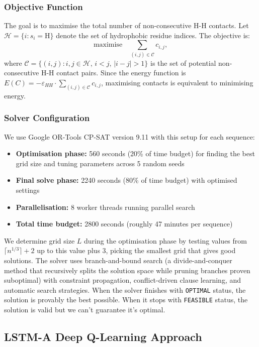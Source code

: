 \documentclass{article}
\theoremstyle{plain}
\theoremstyle{definition}
\begin{document}
\subsubsection{Objective Function}

The goal is to maximise the total number of non-consecutive H-H contacts. Let $\mathcal{H} = \{i : s_i = \text{H}\}$ denote the set of hydrophobic residue indices. The objective is:
\begin{equation}
\text{maximise} \quad \sum_{(i,j) \in \mathcal{C}} c_{i,j},
\end{equation}
where $\mathcal{C} = \{(i,j) : i,j \in \mathcal{H}, \, i < j, \, |i - j| > 1\}$ is the set of potential non-consecutive H-H contact pairs. Since the energy function is $E(C) = -\varepsilon_{HH} \cdot \sum_{(i,j) \in \mathcal{C}} c_{i,j}$, maximising contacts is equivalent to minimising energy.

\subsubsection{Solver Configuration}

We use Google OR-Tools CP-SAT version 9.11 with this setup for each sequence:
\begin{itemize}
\item \textbf{Optimisation phase:} 560 seconds (20\% of time budget) for finding the best grid size and tuning parameters across 5 random seeds
\item \textbf{Final solve phase:} 2240 seconds (80\% of time budget) with optimised settings
\item \textbf{Parallelisation:} 8 worker threads running parallel search
\item \textbf{Total time budget:} 2800 seconds (roughly 47 minutes per sequence)
\end{itemize}
We determine grid size $L$ during the optimisation phase by testing values from $\lceil n^{1/3} \rceil + 2$ up to this value plus 3, picking the smallest grid that gives good solutions. The solver uses branch-and-bound search (a divide-and-conquer method that recursively splits the solution space while pruning branches proven suboptimal) with constraint propagation, conflict-driven clause learning, and automatic search strategies. When the solver finishes with \texttt{OPTIMAL} status, the solution is provably the best possible. When it stops with \texttt{FEASIBLE} status, the solution is valid but we can't guarantee it's optimal.

\subsection{LSTM-A Deep Q-Learning Approach}\label{sec:lstma_approach}
\end{document}
